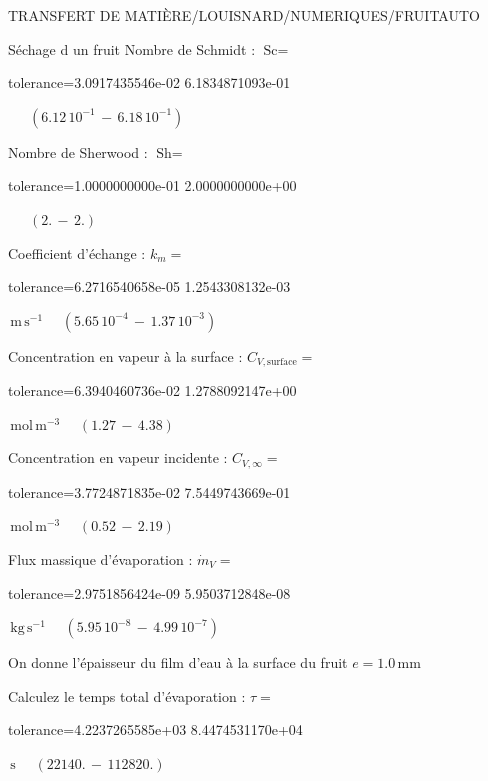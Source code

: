 \documentclass[12pt]{article}
\begin{document}
\begin{quiz}{TRANSFERT DE MATIÈRE/LOUISNARD/NUMERIQUES/FRUITAUTO}
\begin{cloze}{Séchage d un fruit}
Nombre de Schmidt : $\text{Sc} =  $
\begin{numerical}[points=1] 
\item[tolerance={3.0917435546e-02}] 6.1834871093e-01 
\end{numerical} 
 $\,$ 
 $ \quad ( 6.12 \, 10^{-1}  \, - \,  6.18 \, 10^{-1} ) $ 

Nombre de Sherwood : $\text{Sh} =  $
\begin{numerical}[points=2] 
\item[tolerance={1.0000000000e-01}] 2.0000000000e+00 
\end{numerical} 
 $\,$ 
 $ \quad (2. \, - \, 2.) $ 

Coefficient d'échange : $k_m =  $
\begin{numerical}[points=1] 
\item[tolerance={6.2716540658e-05}] 1.2543308132e-03 
\end{numerical} 
 $\,  \mathrm{m}\,  \mathrm{s}^{-1}$ 
 $ \quad ( 5.65 \, 10^{-4}  \, - \,  1.37 \, 10^{-3} ) $ 

Concentration en vapeur à la surface : $C_{V, \text{surface}} =  $
\begin{numerical}[points=2] 
\item[tolerance={6.3940460736e-02}] 1.2788092147e+00 
\end{numerical} 
 $\,  \mathrm{mol}\,  \mathrm{m}^{-3}$ 
 $ \quad (1.27 \, - \, 4.38) $ 

Concentration en vapeur incidente : $C_{V, \infty} =  $
\begin{numerical}[points=2] 
\item[tolerance={3.7724871835e-02}] 7.5449743669e-01 
\end{numerical} 
 $\,  \mathrm{mol}\,  \mathrm{m}^{-3}$ 
 $ \quad (0.52 \, - \, 2.19) $ 

Flux massique d'évaporation : $\dot{m}_V =  $
\begin{numerical}[points=1] 
\item[tolerance={2.9751856424e-09}] 5.9503712848e-08 
\end{numerical} 
 $\,  \mathrm{kg}\,  \mathrm{s}^{-1}$ 
 $ \quad ( 5.95 \, 10^{-8}  \, - \,  4.99 \, 10^{-7} ) $ 

 

On donne l'épaisseur du film d'eau à la surface du fruit $e = 1.0\,  \mathrm{mm} $

Calculez le temps total d'évaporation : $\tau =  $
\begin{numerical}[points=2] 
\item[tolerance={4.2237265585e+03}] 8.4474531170e+04 
\end{numerical} 
 $\,  \mathrm{s}$ 
 $ \quad (22140. \, - \, 112820.) $ 


\end{cloze}
\end{quiz}
\end{document}
